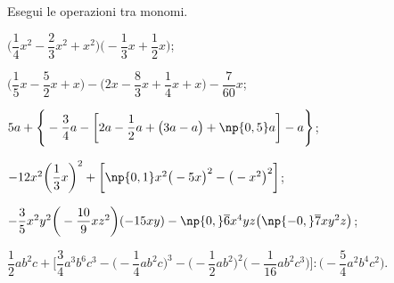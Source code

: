 \begin{esercizio}[\Ast]
 \label{ese:9.34}
Esegui le operazioni tra monomi.

\begin{enumeratea}
 \item $\bigg(\dfrac{1}{4}x^{2}-\dfrac{2}{3}x^{2}+x^{2}\bigg)\bigg(-{\dfrac{1}{3}}x+\dfrac{1}{2}x\bigg)$;
 \item $\bigg(\dfrac{1}{5}x-\dfrac{5}{2}x+x\bigg)-\bigg(2x-\dfrac{8}{3}x+\dfrac{1}{4}x+x\bigg)-\dfrac{7}{60}x$;
 \item $5a+\Bigg\{-{\dfrac{3}{4}}a-\bigg[2a-\dfrac{1}{2}a+\big(3a-a\big)+\np{0,5}a\bigg]-a\Bigg\}$;
 \item $-12x^{2}\bigg(\dfrac{1}{3}x\bigg)^{2}+\bigg[\np{0,1}x^{2}\big(-5x\big)^{2}-\big(-x^{2}\big)^{2}\bigg]$;
 \item $-{\dfrac{3}{5}}x^{2}y^{2}\bigg(-{\dfrac{10}{9}}xz^{2}\bigg)(-15xy)-\np{0,}\overline{{6}}x^{4}yz\big(\np{-0,}\overline{{7}}xy^{2}z\big)$;
 \item $\dfrac{1}{2}ab^{2}c+\Bigg[\dfrac{3}{4}a^{3}b^{6}c^{3}-\bigg(-{\dfrac{1}{4}ab^{2}c}\bigg)^{3}-\bigg(-{\dfrac{1}{2}ab^{2}}\bigg)^{2}\bigg(-{\dfrac{1}{16}ab^{2}c^{3}}\bigg)\Bigg]:%
 \bigg(-{\dfrac{5}{4}a^{2}b^{4}c^{2}}\bigg)$.
\end{enumeratea}
\end{esercizio}

